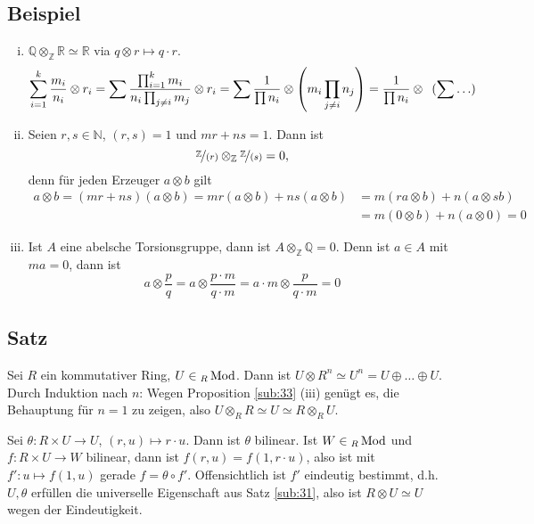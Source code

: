 \subsection[Beispiele zu Tensorprodukten]{Beispiel} %
\label{sub:34}
\begin{enumerate}[(i)]
	\item $\mathds{Q} \otimes_\mathds{Z} \mathds{R} \simeq \mathds{R}$ via $q \otimes r \mapsto q \cdot r$.
	\begin{align*}
		\sum_{i=1}^{k} \frac{m_i}{n_i} \otimes r_i = \sum \frac{\prod_{i=1}^k m_i}{n_i \prod_{j \not= i} m_j} \otimes r_i  = \sum \frac{1}{\prod n_i} \otimes
		\enbrace*{m_i \prod_{j\not= i} n_j} = \frac{1}{\prod n_i} \otimes \enspace(\sum \ldots )   
	\end{align*}
	\item Seien $r,s \in \mathds{N}$, $(r,s)=1$ und $m r + n s =1$. Dann ist 
	\[
		\nicefrac{\mathds{Z}}{(r)} \otimes_\mathds{Z} \nicefrac{\mathds{Z}}{(s)} = 0,
	\]
	denn für jeden Erzeuger $a \otimes b$ gilt 
	\begin{align*}
		a \otimes b = (m r + n s) (a \otimes b) = m r (a \otimes b) + n s (a \otimes b) &= m( r a \otimes b) + n(a \otimes  s b) \\&= m(0 \otimes b) + n( a \otimes 0) = 0
	\end{align*}
	\item Ist $A$ eine abelsche Torsionsgruppe, dann ist $A \otimes_\mathds{Z} \mathds{Q} = 0$. Denn ist $a \in A$ mit $m a = 0$, dann ist 
	\[
		a \otimes  \frac{p}{q} = a \otimes \frac{p \cdot m}{q \cdot m} = a \cdot m \otimes \frac{p}{q \cdot m} = 0  
	\]
\end{enumerate}

\subsection[Satz: Tensorprodukt eines $R$-Moduls und $R^n$]{Satz} %
\label{sub:35}
Sei $R$ ein kommutativer Ring, $U \in {_R \Mod}$. Dann ist $U \otimes R^n \simeq U^n= U \oplus \ldots \oplus U$. 
Durch Induktion nach $n$: Wegen Proposition \ref{sub:33} (iii) genügt es, die Behauptung für $n=1$ zu zeigen, also $U \otimes_R R \simeq U \simeq R \otimes_R U$.

Sei $\theta : R \times U \to U$, $(r,u) \mapsto r \cdot u$. Dann ist $\theta$ bilinear. Ist $W \in {_R  \Mod}$ und $f : R \times U  \to W$ bilinear, dann ist 
$f(r,u)= f(1, r \cdot u)$, also ist mit $f' : u \mapsto f(1,u)$ gerade $f = \theta \circ f'$. Offensichtlich ist $f'$ eindeutig bestimmt, d.h. $U, \theta$ erfüllen
die universelle Eigenschaft aus Satz \ref{sub:31}, also ist $R \otimes U \simeq U$ wegen der Eindeutigkeit. \bewende

